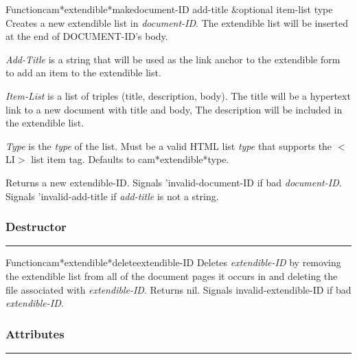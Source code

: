 \begin{functiondoc}{Function}{cam*extendible*make}{document-ID add-title \&optional item-list type}
Creates a new extendible list in {\em document-ID}.  The extendible list will be
inserted at the end of DOCUMENT-ID's body.

{\em Add-Title} is a string that will be used as the link anchor to the extendible form 
 to add an item to the extendible list.

{\em Item-List} is a list of triples (title, description, body).  The title will be
 a hypertext link to a new document with title and body,  The description will be
 included in the extendible list.

{\em Type} is the {\em type} of the list.  Must be a valid HTML list {\em type} that supports the 
 $<$LI$>$ list item tag.  Defaults to cam*extendible*type.

Returns a new extendible-ID.
Signals 'invalid-document-ID if bad {\em document-ID}.
Signals 'invalid-add-title if {\em add-title} is not a string.
\end{functiondoc}


\subsubsection*{Destructor}
\par\vspace*{0.00in}\par\hrule\par\medskip\par


\begin{functiondoc}{Function}{cam*extendible*delete}{extendible-ID}
Deletes {\em extendible-ID} by removing the extendible list from all of the 
document pages it occurs in and deleting the file associated with {\em extendible-ID}.
Returns nil.
Signals invalid-extendible-ID if bad {\em extendible-ID}.
\end{functiondoc}


\subsubsection*{Attributes}
\par\vspace*{0.00in}\par\hrule\par\medskip\par



